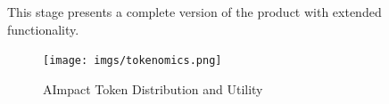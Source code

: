 \documentclass[12pt,a4paper]{article}
\begin{document}
This stage presents a complete version of the product with extended functionality.


\newpage

\begin{figure}[h]
    \centering
    \texttt{[image: imgs/tokenomics.png]}
    \caption{AImpact Token Distribution and Utility}
    \label{fig:tokenomics}
\end{figure}
\end{document}

